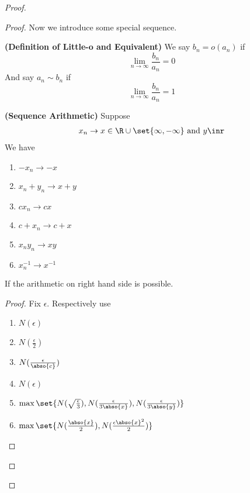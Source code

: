 \documentclass{report}
\begin{document}
\begin{proof}
\begin{proof}
{\begin{minipage}{39em}
Now we introduce some special sequence. 
\end{minipage}}
\begin{definition}
\label{4.1.5}
\textbf{(Definition of Little-o and Equivalent)} We say $b_n=o(a_n)$ if
\begin{equation*}
\lim_{n\to\infty}\frac{b_n}{a_n}=0
\end{equation*}
And say $a_n\sim b_n$ if
\begin{equation*}
\lim_{n\to\infty} \frac{b_n}{a_n}=1
\end{equation*}
\end{definition}
\begin{theorem}
\label{4.1.6}
\textbf{(Sequence Arithmetic)} Suppose 
\begin{align*}
x_n \to x \in \R\cup \set{\infty,-\infty}\text{ and }y\inr
\end{align*}
We have 
\begin{enumerate}[label=(\alph*)]
  \item $-x_n \to -x$ 
  \item $x_n+y_n\to x+y$
  \item $cx_n\to cx$
  \item $c+x_n \to c+x$
  \item $x_ny_n \to xy$
  \item  $x_n^{-1}\to x^{-1}$
\end{enumerate}
If the arithmetic on right hand side is possible. 
\end{theorem}
\begin{proof}
Fix $\epsilon $. Respectively use 
\begin{enumerate}[label=(\alph*)]
  \item $N(\epsilon )$
  \item $N(\frac{\epsilon}{2})$
  \item  $N(\frac{\epsilon}{\abso{c}})$ 
  \item $N(\epsilon )$
  \item  $\max \set{N(\sqrt{\frac{\epsilon}{3}} ),N (\frac{\epsilon }{3\abso{x}}),N(\frac{\epsilon }{3\abso{y}})}$
  \item $\max \set{N(\frac{\abso{x}}{2}),N(\frac{\epsilon \abso{x}^2}{2})}$
\end{enumerate}

\end{proof}
\end{proof}
\end{proof}
\end{document}
